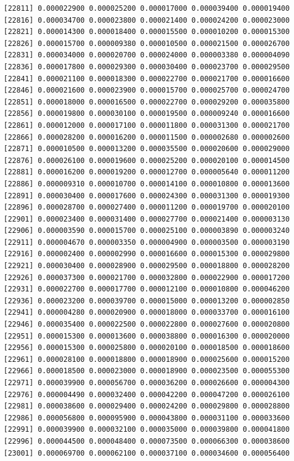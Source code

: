 \documentclass[]{article}
\begin{document}
\begin{verbatim}
[22811] 0.000022900 0.000025200 0.000017000 0.000039400 0.000019400
[22816] 0.000034700 0.000023800 0.000021400 0.000024200 0.000023000
[22821] 0.000014300 0.000018400 0.000015500 0.000010200 0.000015300
[22826] 0.000015700 0.000009380 0.000010500 0.000021500 0.000026700
[22831] 0.000034000 0.000020700 0.000024000 0.000003380 0.000004090
[22836] 0.000017800 0.000029300 0.000030400 0.000023700 0.000029500
[22841] 0.000021100 0.000018300 0.000022700 0.000021700 0.000016600
[22846] 0.000021600 0.000023900 0.000015700 0.000025700 0.000024700
[22851] 0.000018000 0.000016500 0.000022700 0.000029200 0.000035800
[22856] 0.000019800 0.000030100 0.000019500 0.000009240 0.000016600
[22861] 0.000012000 0.000017100 0.000011800 0.000031300 0.000021700
[22866] 0.000028200 0.000016200 0.000011500 0.000002680 0.000002600
[22871] 0.000010500 0.000013200 0.000035500 0.000020600 0.000029000
[22876] 0.000026100 0.000019600 0.000025200 0.000020100 0.000014500
[22881] 0.000016200 0.000019200 0.000012700 0.000005640 0.000011200
[22886] 0.000009310 0.000010700 0.000014100 0.000010800 0.000013600
[22891] 0.000030400 0.000017600 0.000024300 0.000031300 0.000019300
[22896] 0.000028700 0.000027400 0.000011200 0.000019700 0.000020100
[22901] 0.000023400 0.000031400 0.000027700 0.000021400 0.000003130
[22906] 0.000003590 0.000015700 0.000025100 0.000003890 0.000003240
[22911] 0.000004670 0.000003350 0.000004900 0.000003500 0.000003190
[22916] 0.000002400 0.000002990 0.000016600 0.000015300 0.000029800
[22921] 0.000030400 0.000028900 0.000029500 0.000018800 0.000028200
[22926] 0.000037300 0.000021700 0.000032800 0.000022900 0.000017200
[22931] 0.000022700 0.000017700 0.000012100 0.000010800 0.000046200
[22936] 0.000023200 0.000039700 0.000015000 0.000013200 0.000002850
[22941] 0.000004280 0.000020900 0.000018000 0.000033700 0.000016100
[22946] 0.000035400 0.000022500 0.000022800 0.000027600 0.000020800
[22951] 0.000015300 0.000013600 0.000038800 0.000016300 0.000020000
[22956] 0.000015300 0.000025800 0.000020100 0.000018500 0.000018600
[22961] 0.000028100 0.000018800 0.000018900 0.000025600 0.000015200
[22966] 0.000018500 0.000023000 0.000018900 0.000023500 0.000055300
[22971] 0.000039900 0.000056700 0.000036200 0.000026600 0.000004300
[22976] 0.000004490 0.000032400 0.000042200 0.000047200 0.000026100
[22981] 0.000038600 0.000029400 0.000024200 0.000029800 0.000028800
[22986] 0.000056800 0.000095900 0.000043800 0.000031100 0.000033600
[22991] 0.000039900 0.000032100 0.000035000 0.000039800 0.000041800
[22996] 0.000044500 0.000048400 0.000073500 0.000066300 0.000038600
[23001] 0.000069700 0.000062100 0.000037100 0.000034600 0.000056400

\end{verbatim}
\end{document}
